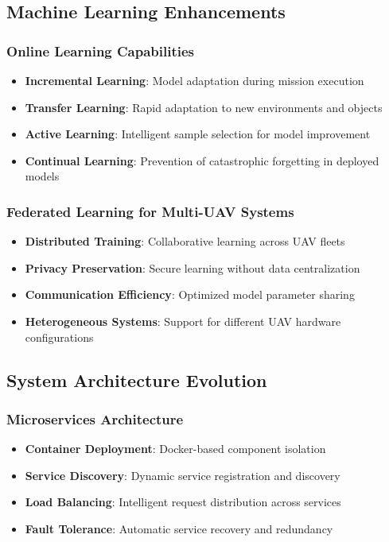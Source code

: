 \documentclass[11pt,a4paper]{article}
\begin{document}
\subsection{Machine Learning Enhancements}

\subsubsection{Online Learning Capabilities}

\begin{itemize}
    \item \textbf{Incremental Learning}: Model adaptation during mission execution
    \item \textbf{Transfer Learning}: Rapid adaptation to new environments and objects
    \item \textbf{Active Learning}: Intelligent sample selection for model improvement
    \item \textbf{Continual Learning}: Prevention of catastrophic forgetting in deployed models
\end{itemize}

\subsubsection{Federated Learning for Multi-UAV Systems}

\begin{itemize}
    \item \textbf{Distributed Training}: Collaborative learning across UAV fleets
    \item \textbf{Privacy Preservation}: Secure learning without data centralization
    \item \textbf{Communication Efficiency}: Optimized model parameter sharing
    \item \textbf{Heterogeneous Systems}: Support for different UAV hardware configurations
\end{itemize}

\subsection{System Architecture Evolution}

\subsubsection{Microservices Architecture}

\begin{itemize}
    \item \textbf{Container Deployment}: Docker-based component isolation
    \item \textbf{Service Discovery}: Dynamic service registration and discovery
    \item \textbf{Load Balancing}: Intelligent request distribution across services
    \item \textbf{Fault Tolerance}: Automatic service recovery and redundancy
\end{itemize}
\end{document}
